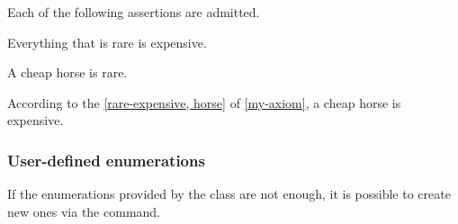 \documentclass[english,nolocaltoc]{nwejmart}
\newtheorem[style=definition]{fact}
\newtheorem[title-plural=Criteria]{criterion}
\newtheorem[title=random experiment]{rexp}
\begin{document}
\begin{bodycode}[listing and text,listing options={deletekeywords={[2]label}}]
\begin{axiom}\label{my-axiom}
  Each of the following assertions are admitted.
  \begin{assertions}
  \item\label{rare-expensive} Everything that is rare is expensive.
  \item\label{horse}A cheap horse is rare.
  \end{assertions}
\end{axiom}
According to the \vref{rare-expensive, horse} of \vref{my-axiom}, a
cheap horse is expensive.
\end{bodycode}

\subsubsection{User-defined enumerations}

If the enumerations provided by the  class are not enough, it is
possible to create new ones via the  command.
\end{document}

